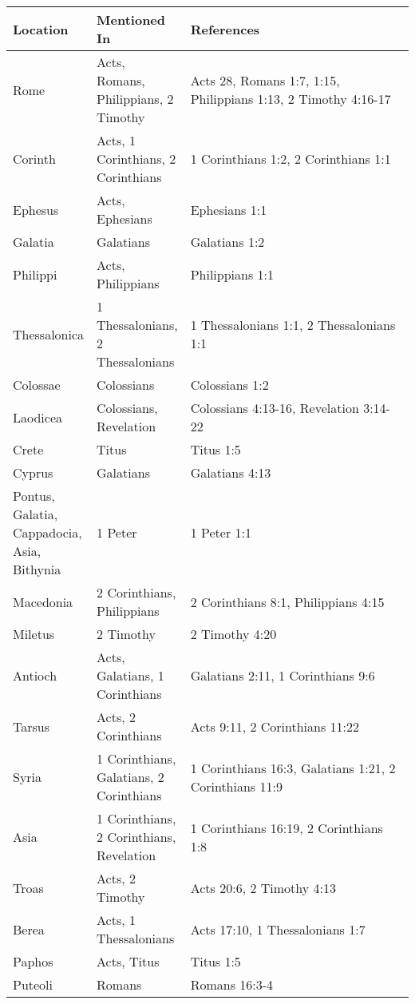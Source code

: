 \begin{longtable}[]{@{}p{0.15\linewidth} p{0.15\linewidth} p{0.7\linewidth}@{}}
\toprule\noalign{}
\begin{minipage}[b]{\linewidth}\raggedright
Location
\end{minipage} & \begin{minipage}[b]{\linewidth}\raggedright
Mentioned In
\end{minipage} & \begin{minipage}[b]{0.7\linewidth}\raggedright
References
\end{minipage} \\
\midrule
\endhead
\bottomrule
\endlastfoot
Rome & Acts, Romans, Philippians, 2 Timothy & Acts 28, Romans 1:7, 1:15, Philippians 1:13, 2 Timothy 4:16-17 \\
Corinth & Acts, 1 Corinthians, 2 Corinthians & 1 Corinthians 1:2, 2 Corinthians 1:1 \\
Ephesus & Acts, Ephesians & Ephesians 1:1 \\
Galatia & Galatians & Galatians 1:2 \\
Philippi & Acts, Philippians & Philippians 1:1 \\
Thessalonica & 1 Thessalonians, 2 Thessalonians & 1 Thessalonians 1:1, 2 Thessalonians 1:1 \\
Colossae & Colossians & Colossians 1:2 \\
Laodicea & Colossians, Revelation & Colossians 4:13-16, Revelation 3:14-22 \\
Crete & Titus & Titus 1:5 \\
Cyprus & Galatians & Galatians 4:13 \\
Pontus, Galatia, Cappadocia, Asia, Bithynia & 1 Peter & 1 Peter 1:1 \\
Macedonia & 2 Corinthians, Philippians & 2 Corinthians 8:1, Philippians 4:15 \\
Miletus & 2 Timothy & 2 Timothy 4:20 \\
Antioch & Acts, Galatians, 1 Corinthians & Galatians 2:11, 1 Corinthians 9:6 \\
Tarsus & Acts, 2 Corinthians & Acts 9:11, 2 Corinthians 11:22 \\
Syria & 1 Corinthians, Galatians, 2 Corinthians & 1 Corinthians 16:3, Galatians 1:21, 2 Corinthians 11:9 \\
Asia & 1 Corinthians, 2 Corinthians, Revelation & 1 Corinthians 16:19, 2 Corinthians 1:8 \\
Troas & Acts, 2 Timothy & Acts 20:6, 2 Timothy 4:13 \\
Berea & Acts, 1 Thessalonians & Acts 17:10, 1 Thessalonians 1:7 \\
Paphos & Acts, Titus & Titus 1:5 \\
Puteoli & Romans & Romans 16:3-4 \\
\end{longtable}


